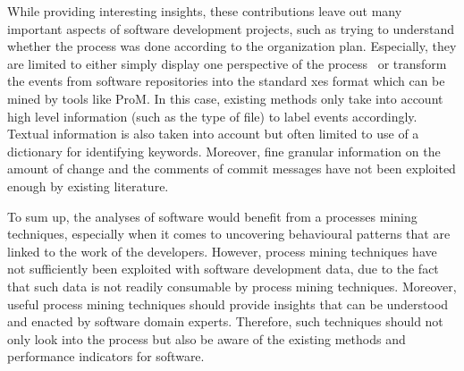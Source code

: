While providing interesting insights, these contributions leave out many important aspects of software development projects, such as trying to understand whether the process was done according to the organization plan. Especially, they are limited to either simply display one perspective of the process~\citep{Song2007} or transform the events from software repositories into the standard \gls{xes} format which can be mined by tools like ProM. In this case, existing methods only take into account high level information (such as the type of file) to label events accordingly. Textual information is also taken into account \citep{rubin2007process} but often limited to use of a dictionary for identifying keywords. Moreover, fine granular information on the amount of change and the comments of commit messages have not been exploited enough by existing literature.



To sum up, the analyses of software would benefit from a processes mining techniques, especially when it comes to uncovering behavioural patterns that are linked to the work of the developers. However, process mining techniques have not sufficiently been exploited with software development data, due to the fact that such data is not readily consumable by process mining techniques. Moreover, useful process mining techniques should provide insights that can be understood and enacted by software domain experts. Therefore, such techniques should not only look into the process but also be aware of the existing methods and performance indicators for software.  








